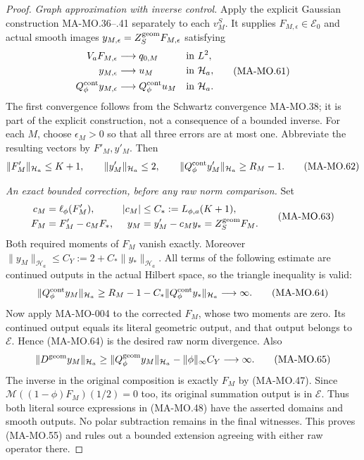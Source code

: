 \begin{proof}
\emph{Graph approximation with inverse control.}
Apply the explicit Gaussian construction MA-MO.36--.41
separately to each \(v_M^S\). It supplies
\(F_{M,\epsilon}\in\mathcal E_0\) and actual smooth images
\(y_{M,\epsilon}=Z_S^{\rm geom}F_{M,\epsilon}\) satisfying
\[
 \begin{aligned}
 V_aF_{M,\epsilon}&\longrightarrow q_{0,M}&&\text{in }L^2,\\
 y_{M,\epsilon}&\longrightarrow u_M&&\text{in }\mathcal H_a,\\
 Q_\phi^{\rm cont}y_{M,\epsilon}
      &\longrightarrow Q_\phi^{\rm cont}u_M&&\text{in }\mathcal H_a.
 \end{aligned}
 \tag{MA-MO.61}
\]
The first convergence follows from the Schwartz convergence
MA-MO.38; it is part of the explicit construction, not a
consequence of a bounded inverse. For each \(M\), choose
\(\epsilon_M>0\) so that all three errors are at most one.
Abbreviate the resulting vectors by \(F'_M,y'_M\). Then
\[
 \|F'_M\|_{\mathcal H_a}\le K+1,\qquad
 \|y'_M\|_{\mathcal H_a}\le2,\qquad
 \|Q_\phi^{\rm cont}y'_M\|_{\mathcal H_a}\ge R_M-1.
 \tag{MA-MO.62}
\]

\emph{An exact bounded correction, before any raw norm comparison.}
Set
\[
 \begin{aligned}
 c_M&=\ell_\phi(F'_M),&|c_M|&\le C_*:=L_{\phi,a}(K+1),\\
 F_M&=F'_M-c_MF_*,&y_M&=y'_M-c_My_*=Z_S^{\rm geom}F_M.
 \end{aligned}
 \tag{MA-MO.63}
\]
Both required moments of \(F_M\) vanish exactly. Moreover
\(\|y_M\|_{\mathcal H_a}\le C_Y:=2+C_*\|y_*\|_{\mathcal H_a}\).
All terms of the following estimate are continued outputs
in the actual Hilbert space, so the triangle inequality is valid:
\[
 \|Q_\phi^{\rm cont}y_M\|_{\mathcal H_a}
 \ge R_M-1-C_*\|Q_\phi^{\rm cont}y_*\|_{\mathcal H_a}
                              \longrightarrow\infty.
 \tag{MA-MO.64}
\]
Now apply MA-MO-004 to the corrected \(F_M\), whose two
moments are zero. Its continued output equals its literal
geometric output, and that output belongs to \(\mathcal E\).
Hence (MA-MO.64) is the desired raw norm divergence. Also
\[
 \|D^{\rm geom}y_M\|_{\mathcal H_a}
    \ge\|Q_\phi^{\rm geom}y_M\|_{\mathcal H_a}
                         -\|\phi\|_\infty C_Y
                                \longrightarrow\infty.
 \tag{MA-MO.65}
\]
The inverse in the original composition is exactly \(F_M\)
by (MA-MO.47). Since
\(\mathcal M((1-\phi)F_M)(1/2)=0\) too, its original
summation output is in \(\mathcal E\). Thus both literal
source expressions in (MA-MO.48) have the asserted domains
and smooth outputs. No polar subtraction remains in the
final witnesses. This proves (MA-MO.55) and rules out a
bounded extension agreeing with either raw operator there.
\end{proof}

